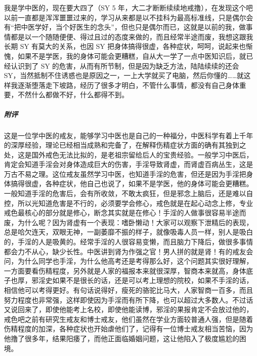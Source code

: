 \begin{case}
    我是学中医的，现在要大四了（SY 5 年，大二才断断续续地戒撸），在发现这个吧以前一直都是浑浑噩噩过来的，学习从来都是以不挂科为最高标准线，只是偶尔会有“把中医学好，当个好医生的念头”，但也只是偶尔而已，这就是以前的我，做事情都是以一个随随便便、得过且过的态度来做的，而且经常半途而废，我想这跟我长期 SY 有莫大的关系，也因 SY 把身体搞得很虚，各种症状，呵呵，说起来也惭愧，如果不是学医，我的身体可能会更糟糕，自从大一学了一点中医知识后，就已经认识到了 SY 的危害，从而有所节制，但是因为缺乏方法，陆陆续续的还会 SY，当然抵制不住诱惑也是原因之一，一上大学就买了电脑，然后你懂的……就这样我逐渐堕落走下坡路，经历了很多才明白，不管什么事情，都没有自己身体重要，不然什么都做不好，什么都得不到。
    \subparagraph{附评} 这是一位学中医的戒友，能够学习中医也是自己的一种福分，中医科学有着上千年的深厚经验，理论已经相当成熟和完备了，在解释伤精症状方面的确有其独到之处，这是国外戒色无法比拟的，是老祖宗留给后人的宝贵经验。一般学习中医后，肯定会知道手淫会对身体造成巨大的伤害，手淫导致肾虚，而肾虚百病丛生，这是万古不易之理。这位戒友虽然学习中医，也知道手淫的危害，但还是因为手淫把身体搞得很虚，各种症状，他自己也说了，如果不是学医，他的身体可能会更糟糕。一般知道手淫的危害后，会有所收敛，不敢太疯狂，但是邪念上脑后，还是难以自控，所以光知道危害是不行的，必须要学会修心，戒色就是在起心动念上修，专业戒色最核心的部分就是修心，断念其实就是在修心！手淫的人做事很容易半途而废，为什么呢？因为肾虚有一个表现：嗜卧懒动！大家可以观察下泄精后的表现，总是哈欠连天，双眼无神，一副萎靡不振的样子，就像吸毒人员一样，别人是吸白的，手淫的人是吸黄的。经常手淫的人很容易变懒，而且脑力下降后，做很多事情都会力不从心，缺少长性。中医讲到肾为作强之官！男人拼的就是肾！有的戒友会问，为什么同学也手淫，为什么他高考还是考得那么好，这个问题其实很好理解，一方面要看伤精程度，另外就是人家的福报本来就很深厚，智商本来就高，身体底子也厚，邪淫史如果不是很长的话，还是可以考上理想的院校，如果不手淫的话，相信他可以考得更好。有句话说得好，瘦死的骆驼比马大，人家智商一百多，而且努力程度也非常强，这样即使因为手淫而有所下降，也可以超过大多数人。不过话又说回来了，即使他能考上名校，即使他能读博，邪淫的果报肯定不会放过他的，戒色吧之前有研究生戒友和博士戒友，他们虽然在学业方面较普通人强，但是随着伤精程度的加深，各种症状也开始虐他们了，记得有一位博士戒友相当苦恼，因为他撸了很多年，结果阳痿了，而他正面临婚姻问题，这让他陷入了极度尴尬的困境。


\end{case}
